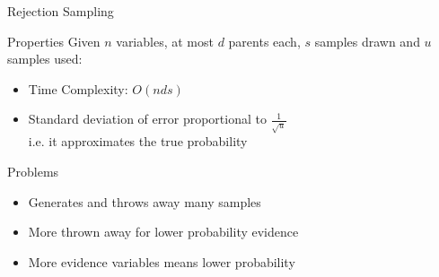 \documentclass[14pt]{beamer}
\begin{document}
\begin{frame}{Rejection Sampling}
	\begin{block}{Properties}
		Given $n$ variables, at most $d$ parents each, $s$ samples drawn and $u$ samples used:
		\begin{itemize}
			\item Time Complexity: \pause $O(nds)$
			\pause
			\item Standard deviation of error proportional to $\frac{1}{\sqrt{u}}$ \\
			      \pause
			      i.e. it approximates the true probability
		\end{itemize}
	\end{block}
	\pause
	\begin{block}{Problems}
		\begin{itemize}
			\item Generates and throws away many samples
			\item More thrown away for lower probability evidence
			\item More evidence variables means lower probability
		\end{itemize}
	\end{block}
\end{frame}
\end{document}
